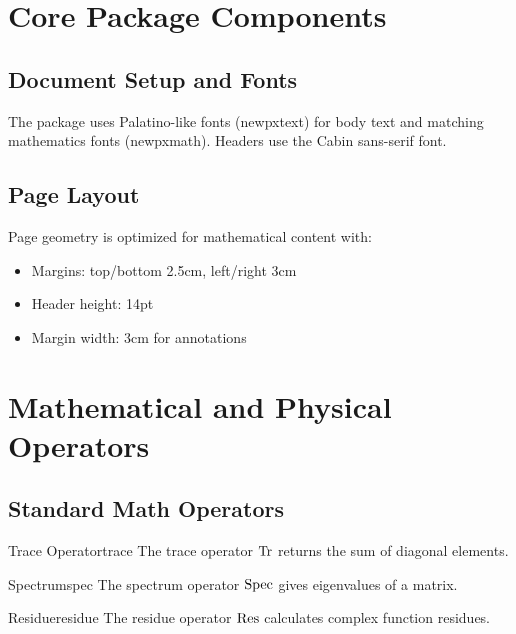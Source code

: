 \documentclass[a4paper]{book}
\begin{document}

\maketocpage

\chapter{Core Package Components}

\section{Document Setup and Fonts}
The package uses Palatino-like fonts (newpxtext) for body text and matching mathematics fonts (newpxmath). Headers use the Cabin sans-serif font.

\section{Page Layout}
Page geometry is optimized for mathematical content with:
\begin{itemize}
\item Margins: top/bottom 2.5cm, left/right 3cm
\item Header height: 14pt
\item Margin width: 3cm for annotations
\end{itemize}

\chapter{Mathematical and Physical Operators}

\section{Standard Math Operators}
\begin{definition}{Trace Operator}{trace}
The trace operator \(\operatorname{Tr}\) returns the sum of diagonal elements.
\end{definition}

\begin{definition}{Spectrum}{spec}
The spectrum operator \(\operatorname{Spec}\) gives eigenvalues of a matrix.
\end{definition}

\begin{definition}{Residue}{residue}
The residue operator \(\operatorname{Res}\) calculates complex function residues.
\end{definition}
\end{document}
